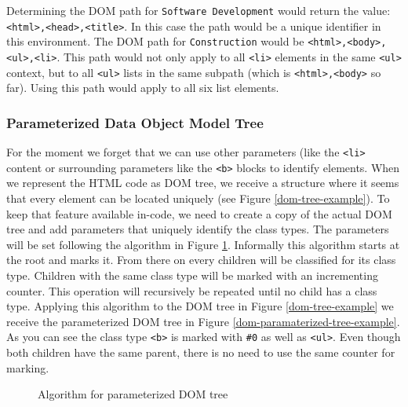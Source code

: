 Determining the DOM path for \verb^Software Development^ would return the value: \verb^<html>,<head>,<title>^. In this case the path would be a unique identifier in this environment. 
The DOM path for \verb^Construction^ would be \verb^<html>,<body>,<ul>,<li>^. This path would not only apply to all \verb^<li>^ elements in the same \verb^<ul>^ context, but to all \verb^<ul>^ lists in the same subpath (which is \verb^<html>,<body>^ so far). Using this path would apply to all six list elements. 

\subsubsection{Parameterized Data Object Model Tree}

For the moment we forget that we can use other parameters (like the \verb^<li>^ content or surrounding parameters like the \verb^<b>^ blocks to identify elements. 
When we represent the HTML code as DOM tree, we receive a structure where it seems that every element can be located uniquely (see Figure \ref{dom-tree-example}). To keep that feature available in-code, we need to create a copy of the actual DOM tree and add parameters that uniquely identify the class types. 
The parameters will be set following the algorithm in Figure \ref{alg-param-dom-tree}. Informally this algorithm starts at the root and marks it. From there on every children will be classified for its class type. Children with the same class type will be marked with an incrementing counter. This operation will recursively be repeated until no child has a class type. 
Applying this algorithm to the DOM tree in Figure \ref{dom-tree-example} we receive the parameterized DOM tree in Figure \ref{dom-paramaterized-tree-example}. As you can see the class type \verb^<b>^ is marked with \verb^#0^ as well as \verb^<ul>^. Even though both children have the same parent, there is no need to use the same counter for marking.

\begin{figure}
\caption{Algorithm for parameterized DOM tree}
\label{alg-param-dom-tree}
\end{figure}

